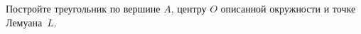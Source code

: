 \documentclass{article}
\begin{document}
\begin{enumerate_boxed}
        \begin{multicols}{2}
            \item
            \begin{center}
            \end{center}
            \item
            \begin{center}
            \end{center}
        \end{multicols}
        \item Постройте треугольник по вершине $A$, центру $O$ описанной окружности и точке Лемуана~$L$.
    \end{enumerate_boxed}
\end{document}
